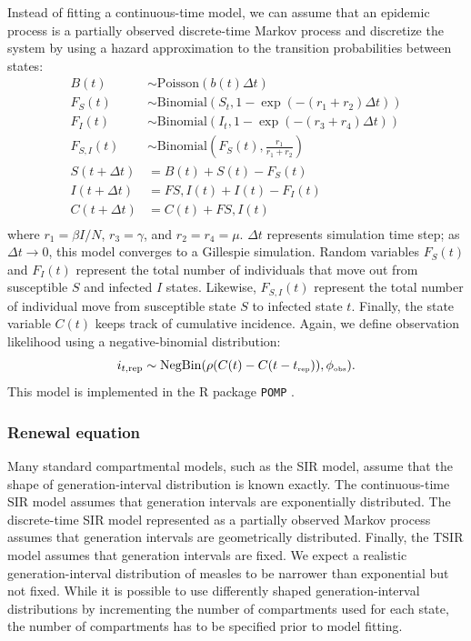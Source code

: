 \documentclass{article}
\newcommand{\tsub}[2]{#1_{{\textrm{\tiny #2}}}}
\begin{document}
Instead of fitting a continuous-time model, we can assume that an epidemic process is a partially observed discrete-time Markov process and discretize the system by using a hazard approximation to the transition probabilities between states:
\begin{equation}
\begin{aligned}
B(t) &\sim \mathrm{Poisson}(b(t) \Delta t)\\
F_{S}(t) &\sim \mathrm{Binomial}(S_t, 1 - \exp(- (r_1 + r_2) \Delta t))\\
F_{I}(t) &\sim \mathrm{Binomial}(I_t, 1 - \exp(- (r_3 + r_4) \Delta t))\\
F_{S,I}(t) &\sim \mathrm{Binomial}\left(F_{S}(t), \frac{r_1}{r_1 + r_2}\right)\\
S(t+\Delta t) &= B(t) + S(t) - F_{S}(t) \\
I(t+\Delta t) &= F{S,I}(t) + I(t) - F_{I}(t)\\
C(t+\Delta t) &= C(t) + F{S,I}(t)\\
\end{aligned}
\end{equation}
where $r_1 = \beta I/N$, $r_3 = \gamma$, and $r_2 = r_4 = \mu$.
$\Delta t$ represents simulation time step; as $\Delta t \to 0$, this model converges to a Gillespie simulation.
Random variables $F_S(t)$ and $F_I(t)$ represent the total number of individuals that move out from susceptible $S$ and infected $I$ states. 
Likewise, $F_{S, I}(t)$ represent the total number of individual move from susceptible state $S$ to infected state $t$.
Finally, the state variable $C(t)$ keeps track of cumulative incidence.
Again, we define observation likelihood using a negative-binomial distribution:
\begin{equation}
i_{t, {\tiny \textrm{rep}}} \sim \mathrm{NegBin}(\rho (C(t) - C(t - \tsub{t}{rep})) , \tsub{\phi}{obs}).
\end{equation}
This model is implemented in the R package \texttt{POMP} \citep{king2015statistical}.

\subsubsection*{Renewal equation}

Many standard compartmental models, such as the SIR model, assume that the shape of generation-interval distribution is known exactly.
The continuous-time SIR model assumes that generation intervals are exponentially distributed.
The discrete-time SIR model represented as a partially observed Markov process assumes that generation intervals are geometrically distributed.
Finally, the TSIR model assumes that generation intervals are fixed.
We expect a realistic generation-interval distribution of measles to be narrower than exponential but not fixed.
While it is possible to use differently shaped generation-interval distributions by incrementing the number of compartments used for each state, the number of compartments has to be specified prior to model fitting.
\end{document}

